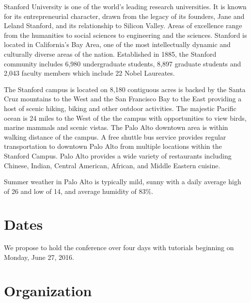 \documentclass[11pt]{article}
\begin{document}
Stanford University is one of the world's leading research
universities. It is known for its entrepreneurial character, drawn
from the legacy of its founders, Jane and Leland Stanford, and its
relationship to Silicon Valley. Areas of excellence range from the
humanities to social sciences to engineering and the
sciences. Stanford is located in California's Bay Area, one of the
most intellectually dynamic and culturally diverse areas of the
nation. Established in 1885, the Stanford community includes 6,980
undergraduate students, 8,897 graduate students and 2,043 faculty
members which include 22 Nobel Laureates.

The Stanford campus is located on 8,180 contiguous acres is backed by
the Santa Cruz mountains to the West and the San Francisco Bay to the
East providing a host of scenic hiking, biking and other outdoor
activities. The majestic Pacific ocean is 24 miles to the West of the
the campus with opportunities to view birds, marine mammals and scenic
vistas. The Palo Alto downtown area is within walking distance of the
campus. A free shuttle bus service provides regular transportation to
downtown Palo Alto from multiple locations within the Stanford
Campus. Palo Alto provides a wide variety of restaurants including
Chinese, Indian, Central American, African, and Middle Eastern
cuisine.

Summer weather in Palo Alto is typically mild, sunny with a daily
average high of {26\celsius} and low of {14\celsius}, and average
humidity of 83\%.

\section*{Dates}

We propose to hold the conference over four days with tutorials
beginning on Monday, June 27, 2016.

\section*{Organization}
\end{document}
